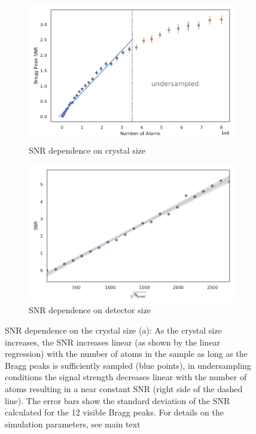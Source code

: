 \begin{figure}
	\centering
	\begin{subfigure}[b]{0.4\textwidth}
		\includegraphics[width=\linewidth]{images/SNRNatoms.pdf}
		\caption{ SNR dependence on crystal size}
		\label{fig:SNRNatoms}
	\end{subfigure}
	\begin{subfigure}[b]{0.4\textwidth}
		\includegraphics[width=\linewidth]{images/detsize.pdf}
		\caption{SNR dependence on detector size}
		\label{fig:SNRdetsize}
	\end{subfigure}
\caption[SNR dependence on crystal size and detector size]{SNR dependence on the crystal size (a): As the crystal size increases, the SNR increases linear (as shown by the linear regression) with the number of atoms in the sample as long as the Bragg peaks is sufficiently sampled (blue points), in undersampling conditions the signal strength decreases linear with the number of atoms resulting in a near constant SNR (right side of the dashed line). The error bars show the standard deviation of the SNR calculated for the 12 visible Bragg peaks. For details on the simulation parameters, see main text}

\end{figure}


